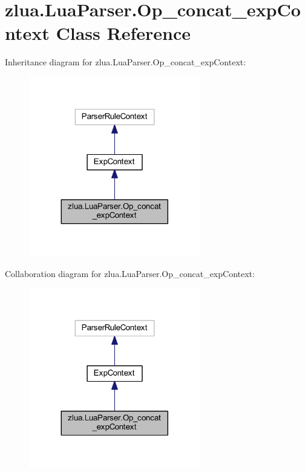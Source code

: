 \hypertarget{classzlua_1_1_lua_parser_1_1_op__concat__exp_context}{}\section{zlua.\+Lua\+Parser.\+Op\+\_\+concat\+\_\+exp\+Context Class Reference}
\label{classzlua_1_1_lua_parser_1_1_op__concat__exp_context}


Inheritance diagram for zlua.\+Lua\+Parser.\+Op\+\_\+concat\+\_\+exp\+Context\+:
\nopagebreak
\begin{figure}[H]
\begin{center}
\leavevmode
\includegraphics[width=212pt]{classzlua_1_1_lua_parser_1_1_op__concat__exp_context__inherit__graph}
\end{center}
\end{figure}


Collaboration diagram for zlua.\+Lua\+Parser.\+Op\+\_\+concat\+\_\+exp\+Context\+:
\nopagebreak
\begin{figure}[H]
\begin{center}
\leavevmode
\includegraphics[width=212pt]{classzlua_1_1_lua_parser_1_1_op__concat__exp_context__coll__graph}
\end{center}
\end{figure}

